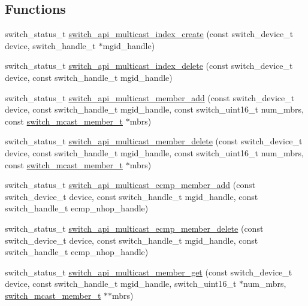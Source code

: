 \subsection*{Functions}
\begin{DoxyCompactItemize}
\item 
switch\+\_\+status\+\_\+t \hyperlink{group__MULTICAST_gaed553572534b4b4beda08a43485081fe}{switch\+\_\+api\+\_\+multicast\+\_\+index\+\_\+create} (const switch\+\_\+device\+\_\+t device, switch\+\_\+handle\+\_\+t $\ast$mgid\+\_\+handle)
\item 
switch\+\_\+status\+\_\+t \hyperlink{group__MULTICAST_ga3d1a64779f1434cf4080bd2be0b6a7df}{switch\+\_\+api\+\_\+multicast\+\_\+index\+\_\+delete} (const switch\+\_\+device\+\_\+t device, const switch\+\_\+handle\+\_\+t mgid\+\_\+handle)
\item 
switch\+\_\+status\+\_\+t \hyperlink{group__MULTICAST_gaee21bb50d53079c7559f1813eec4fea7}{switch\+\_\+api\+\_\+multicast\+\_\+member\+\_\+add} (const switch\+\_\+device\+\_\+t device, const switch\+\_\+handle\+\_\+t mgid\+\_\+handle, const switch\+\_\+uint16\+\_\+t num\+\_\+mbrs, const \hyperlink{structswitch__mcast__member__s}{switch\+\_\+mcast\+\_\+member\+\_\+t} $\ast$mbrs)
\item 
switch\+\_\+status\+\_\+t \hyperlink{group__MULTICAST_gaac3d763e9a89d2fc3374c21eff740f82}{switch\+\_\+api\+\_\+multicast\+\_\+member\+\_\+delete} (const switch\+\_\+device\+\_\+t device, const switch\+\_\+handle\+\_\+t mgid\+\_\+handle, const switch\+\_\+uint16\+\_\+t num\+\_\+mbrs, const \hyperlink{structswitch__mcast__member__s}{switch\+\_\+mcast\+\_\+member\+\_\+t} $\ast$mbrs)
\item 
switch\+\_\+status\+\_\+t \hyperlink{group__MULTICAST_ga287df9d5e7815244963db8166203bbeb}{switch\+\_\+api\+\_\+multicast\+\_\+ecmp\+\_\+member\+\_\+add} (const switch\+\_\+device\+\_\+t device, const switch\+\_\+handle\+\_\+t mgid\+\_\+handle, const switch\+\_\+handle\+\_\+t ecmp\+\_\+nhop\+\_\+handle)
\item 
switch\+\_\+status\+\_\+t \hyperlink{group__MULTICAST_ga4f6c3f2096a36c9d0d4be44e5964b7fe}{switch\+\_\+api\+\_\+multicast\+\_\+ecmp\+\_\+member\+\_\+delete} (const switch\+\_\+device\+\_\+t device, const switch\+\_\+handle\+\_\+t mgid\+\_\+handle, const switch\+\_\+handle\+\_\+t ecmp\+\_\+nhop\+\_\+handle)
\item 
switch\+\_\+status\+\_\+t \hyperlink{group__MULTICAST_gab43492e9cb444611351178e3e1daaf30}{switch\+\_\+api\+\_\+multicast\+\_\+member\+\_\+get} (const switch\+\_\+device\+\_\+t device, const switch\+\_\+handle\+\_\+t mgid\+\_\+handle, switch\+\_\+uint16\+\_\+t $\ast$num\+\_\+mbrs, \hyperlink{structswitch__mcast__member__s}{switch\+\_\+mcast\+\_\+member\+\_\+t} $\ast$$\ast$mbrs)
$$
\end{DoxyCompactItemize}
